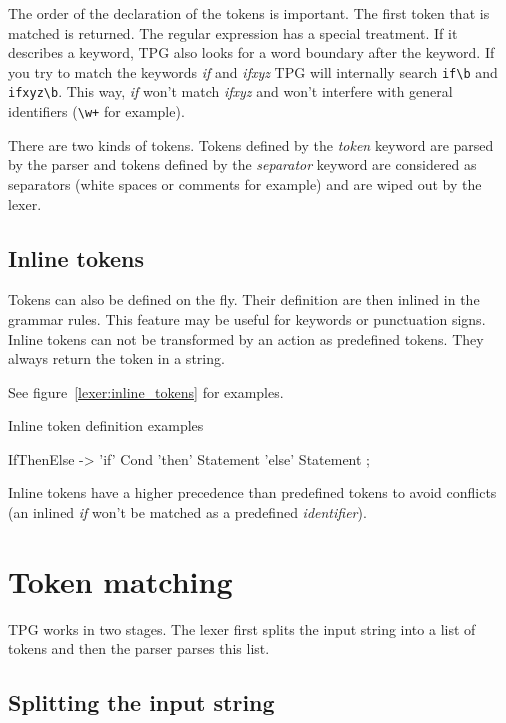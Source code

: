 The order of the declaration of the tokens is important. The first token that is matched is returned. The regular expression has a special treatment. If it describes a keyword, TPG also looks for a word boundary after the keyword. If you try to match the keywords \emph{if} and \emph{ifxyz} TPG will internally search \verb$if\b$ and \verb$ifxyz\b$. This way, \emph{if} won't match \emph{ifxyz} and won't interfere with general identifiers (\verb$\w+$ for example).

There are two kinds of tokens. Tokens defined by the \emph{token} keyword are parsed by the parser and tokens defined by the \emph{separator} keyword are considered as separators (white spaces or comments for example) and are wiped out by the lexer.

\subsection{Inline tokens}

Tokens can also be defined on the fly. Their definition are then inlined in the grammar rules.
This feature may be useful for keywords or punctuation signs.
Inline tokens can not be transformed by an action as predefined tokens.
They always return the token in a string.

See figure~\ref{lexer:inline_tokens} for examples.

\begin{code}
\caption{Inline token definition examples} \label{lexer:inline_tokens}
\begin{verbatimtab}[4]
	IfThenElse ->
		'if' Cond
		'then' Statement
		'else' Statement
		;
\end{verbatimtab}
\end{code}

Inline tokens have a higher precedence than predefined tokens to avoid conflicts (an inlined \emph{if} won't be matched as a predefined \emph{identifier}).

\section{Token matching}
\label{lexer:token_matching}

TPG works in two stages.
The lexer first splits the input string into a list of tokens and then the parser parses this list.

\subsection{Splitting the input string}

